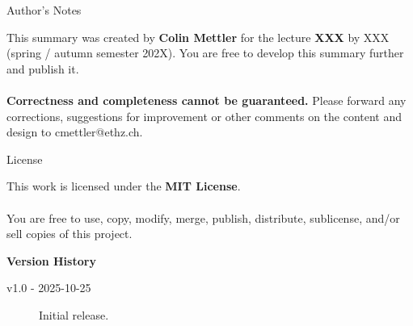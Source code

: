 \begingroup
\raggedright

\begin{topicbox}{\large Author's Notes}
    \raggedright 
    This summary was created by \textbf{Colin Mettler} for the lecture \textbf{XXX} by XXX (spring / autumn semester 202X).
    You are free to develop this summary further and publish it.
    \\~\\
    \textbf{\normalsize Correctness and completeness cannot be guaranteed.} Please forward any corrections, suggestions for improvement or other comments on the content and design to cmettler@ethz.ch.
\end{topicbox}

\vskip 2mm

\begin{topicbox}{\Large License}
    \raggedright
    This work is licensed under the \textbf{MIT License}.
    \\~\\
    You are free to use, copy, modify, merge, publish, distribute, sublicense, and/or sell copies of this project.
\end{topicbox}


\columnbreak

\begin{formulabox}
    \raggedright \large \textbf{Version History} \normalsize
    \begin{description}
        
        \item[\small v1.0 - 2025-10-25] Initial release.
    \end{description}
\end{formulabox}



\endgroup